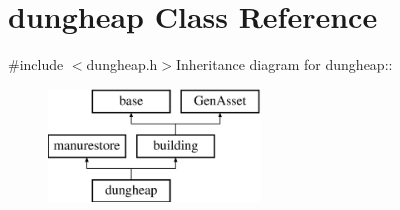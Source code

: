 \hypertarget{classdungheap}{
\section{dungheap Class Reference}
\label{classdungheap}
}


{\ttfamily \#include $<$dungheap.h$>$}Inheritance diagram for dungheap::\begin{figure}[H]
\begin{center}
\leavevmode
\includegraphics[height=3cm]{classdungheap}
\end{center}
\end{figure}
